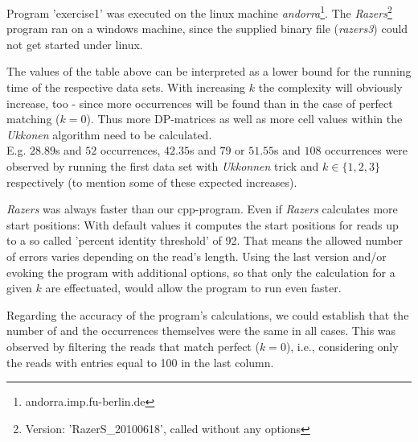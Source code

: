 \documentclass[11pt, notitlepage]{scrartcl}
\begin{document}
Program 'exercise1' was executed on the linux machine \textit{andorra}\footnote{andorra.imp.fu-berlin.de}.  The
\textit{Razers}\footnote{Version: 'RazerS\_20100618', called without any options} program ran on a windows machine,
since the supplied binary file (\textit{razers3}) could not get started under linux.

The values of the table above can be interpreted as a lower bound for the running time of the respective data sets. With
increasing $k$ the complexity will obviously increase, too - since more occurrences will be found than in the case of
perfect matching ($k=0$). Thus more DP-matrices as well as more cell values within the \textit{Ukkonen} algorithm need
to be calculated. \\
E.g. $28.89$s and $52$ occurrences, $42.35$s and $79$ or $51.55$s and $108$ occurrences were observed by running the
first data set with \textit{Ukkonnen} trick and $k \in \{1,2,3\}$ respectively (to mention some of these expected increases).

\textit{Razers} was always faster than our cpp-program. Even if \textit{Razers} calculates more start positions: With
default values it computes the start positions for reads up to a so called 'percent identity threshold' of 92. That
means the allowed number of errors varies depending on the read's length. Using the last version and/or evoking the
program with additional options, so that only the calculation for a given $k$ are effectuated, would allow the program
to run even faster.

Regarding the accuracy of the program's calculations, we could establish that the number of and the occurrences
themselves were the same in all cases. This was observed by filtering the reads that match perfect ($k=0$), i.e.,
considering only the reads with entries equal to 100 in the last column.
\end{document}
